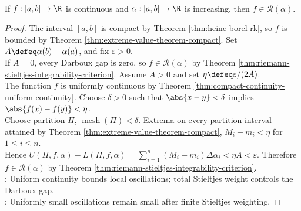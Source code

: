 \begin{theorem} \label{thm:continuous-functions-riemann-stieltjes-integrable} \\
If $f:[a,b]\to\R$ is continuous and $\alpha:[a,b]\to\R$ is increasing, then $f\in\mathcal{R}(\alpha)$.
\begin{proof}
The interval $[a,b]$ is compact by Theorem \ref{thm:heine-borel-rk}, so $f$ is bounded by Theorem \ref{thm:extreme-value-theorem-compact}. Set $A\defeq\alpha(b)-\alpha(a)$, and fix $\varepsilon>0$.\\
If $A=0$, every Darboux gap is zero, so $f\in\mathcal{R}(\alpha)$ by Theorem \ref{thm:riemann-stieltjes-integrability-criterion}. Assume $A>0$ and set $\eta\defeq\varepsilon/(2A)$.\\
The function $f$ is uniformly continuous by Theorem \ref{thm:compact-continuity-uniform-continuity}. Choose $\delta>0$ such that $\abs{x-y}<\delta$ implies $\abs{f(x)-f(y)}<\eta$.\\
Choose partition $\Pi$, $\operatorname{mesh}(\Pi)<\delta$. Extrema on every partition interval attained by Theorem \ref{thm:extreme-value-theorem-compact}, $M_i-m_i<\eta$ for $1\leq i\leq n$.\\
Hence $U(\Pi,f,\alpha)-L(\Pi,f,\alpha) =\sum\limits_{i=1}^{n}(M_i-m_i)\Delta\alpha_i <\eta A<\varepsilon$. Therefore $f\in\mathcal{R}(\alpha)$ by Theorem \ref{thm:riemann-stieltjes-integrability-criterion}.\\
: Uniform continuity bounds local oscillations; total Stieltjes weight controls the Darboux gap.\\
: Uniformly small oscillations remain small after finite Stieltjes weighting.
\end{proof}
\end{theorem}

